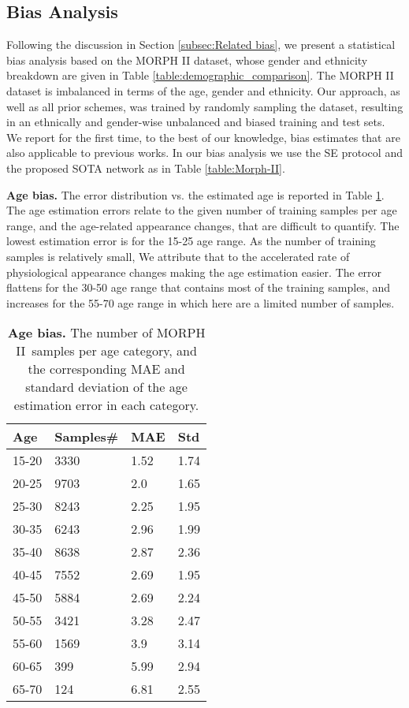 \documentclass[10pt,twocolumn,letterpaper]{article}
\begin{document}
\subsection{Bias Analysis}

\label{subsec:bias}

Following the discussion in Section \ref{subsec:Related bias}, we present a
statistical bias analysis based on the MORPH II dataset, whose gender and
ethnicity breakdown are given in Table \ref{table:demographic_comparison}.
The MORPH II dataset is imbalanced in terms of the age, gender and
ethnicity. Our approach, as well as all prior schemes, was trained by
randomly sampling the dataset, resulting in an ethnically and gender-wise
unbalanced and biased training and test sets. We report for the
first time, to the best of our knowledge, bias estimates that are also
applicable to previous works. In our bias analysis we use the SE protocol
and the proposed SOTA network as in Table \ref{table:Morph-II}.

\textbf{Age bias.} The error distribution vs. the estimated age is reported
in Table \ref{table:morph2_count}. The age estimation errors relate to the given number of training samples per age
range, and the age-related appearance changes, that are difficult to
quantify. The lowest estimation error is for the 15-25 age range. As the number of training samples is relatively small, 
We attribute that to the accelerated rate of physiological appearance changes making the age estimation easier. The
error flattens for the 30-50 age range that contains most of the training
samples, and increases for the 55-70 age range in which here are a limited
number of samples.
\begin{table}[tbh]
\begin{center}
\centering \begin{tabular}{l|l|l|l}
\hline
Age & Samples\# & MAE & Std \\ \hline\hline
15-20 & 3330 & 1.52 & 1.74 \\
20-25 & 9703 & 2.0 & 1.65 \\
25-30 & 8243 & 2.25 & 1.95 \\
30-35 & 6243 & 2.96 & 1.99 \\
35-40 & 8638 & 2.87 & 2.36 \\
40-45 & 7552 & 2.69 & 1.95 \\
45-50 & 5884 & 2.69 & 2.24 \\
50-55 & 3421 & 3.28 & 2.47 \\
55-60 & 1569 & 3.9 & 3.14 \\
60-65 & 399 & 5.99 & 2.94 \\
65-70 & 124 & 6.81 & 2.55 \\ \hline
\end{tabular}\end{center}
\caption{\textbf{Age bias.} The number of MORPH II\ samples per age
category, and the corresponding MAE and standard deviation of the age
estimation error in each category.}
\label{table:morph2_count}
\end{table}
\end{document}
